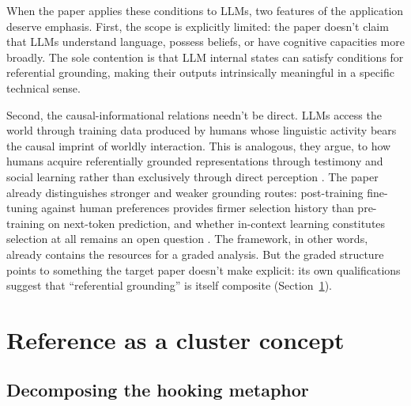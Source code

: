 \documentclass[12pt]{article}
\begin{document}
When the paper applies these conditions to LLMs, two features of the application deserve emphasis. First, the scope is explicitly limited: the paper doesn't claim that LLMs understand language, possess beliefs, or have cognitive capacities more broadly. The sole contention is that LLM internal states can satisfy conditions for referential grounding, making their outputs intrinsically meaningful in a specific technical sense.

Second, the causal-informational relations needn't be direct. LLMs access the world through training data produced by humans whose linguistic activity bears the causal imprint of worldly interaction. This is analogous, they argue, to how humans acquire referentially grounded representations through testimony and social learning rather than exclusively through direct perception \citep[13--14]{coelho_mollo_milliere_2026_vector_grounding_problem}. The paper already distinguishes stronger and weaker grounding routes: post-training fine-tuning against human preferences provides firmer selection history than pre-training on next-token prediction, and whether in-context learning constitutes selection at all remains an open question \citep[15--16]{coelho_mollo_milliere_2026_vector_grounding_problem}. The framework, in other words, already contains the resources for a graded analysis. But the graded structure points to something the target paper doesn't make explicit: its own qualifications suggest that \enquote{referential grounding} is itself composite (Section~\ref{sec:profiles}).

\section{Reference as a cluster concept}
\label{sec:profiles}

\subsection{Decomposing the hooking metaphor}
\label{sec:threshold-to-profile}
\end{document}
